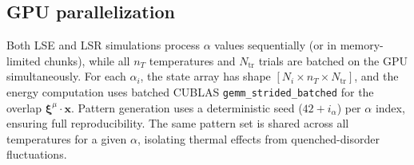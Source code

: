 \documentclass[11pt]{article}
\begin{document}
\subsection{GPU parallelization}

Both LSE and LSR simulations process $\alpha$ values sequentially (or in memory-limited chunks), while all $n_T$ temperatures and $N_{\mathrm{tr}}$ trials are batched on the GPU simultaneously.
For each $\alpha_i$, the state array has shape $[N_i \times n_T \times N_{\mathrm{tr}}]$, and the energy computation uses batched CUBLAS \texttt{gemm\_strided\_batched} for the overlap $\boldsymbol{\xi}^\mu \!\cdot\! \bm{x}$.
Pattern generation uses a deterministic seed ($42 + i_\alpha$) per $\alpha$ index, ensuring full reproducibility.
The same pattern set is shared across all temperatures for a given $\alpha$, isolating thermal effects from quenched-disorder fluctuations.

\end{document}
